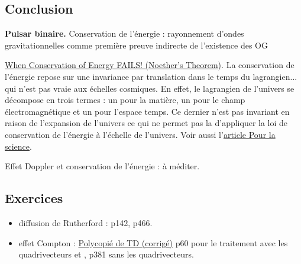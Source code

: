 \subsection*{Conclusion}

\begin{slide}
\textbf{Pulsar binaire.}
Conservation de l'énergie : rayonnement d'ondes gravitationnelles comme première preuve indirecte de l'existence des OG
\end{slide}

\begin{funfact}
\href{https://www.youtube.com/watch?v=cnGYMe6GBeQ}{When Conservation of Energy FAILS! (Noether's Theorem)}.
La conservation de l'énergie repose sur une invariance par translation dans le temps du lagrangien... qui n'est pas vraie aux échelles cosmiques.
En effet, le lagrangien de l'univers se décompose en trois termes : un pour la matière, un pour le champ électromagnétique et un pour l'espace temps.
Ce dernier n'est pas invariant en raison de l'expansion de l'univers ce qui ne permet pas la d'appliquer la loi de conservation de l'énergie à l'échelle de l'univers.
Voir aussi l'\href{https://www.pourlascience.fr/sd/cosmologie/lunivers-perd-il-de-lenergie-1774.php}{article Pour la science}.

\noindent
Effet Doppler et conservation de l'énergie : à méditer.
\end{funfact}


\subsection*{Exercices}

\begin{itemize}
\item diffusion de Rutherford : \cite{Faroux1996} p142, \cite{Michel2017} p466.
\item effet Compton : \href{http://supernovae.in2p3.fr/~llg/Enseignements/Agregation/Relativite/}{Polycopié de TD (corrigé)} p60 pour le traitement avec les quadrivecteurs et \cite{Seigne2014}, p381 sans les quadrivecteurs.
\end{itemize}

\newpage